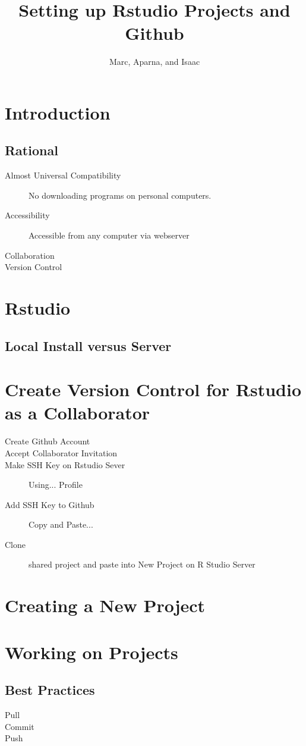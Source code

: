 \documentclass{article}
\author{Marc, Aparna, and Isaac}
\title{Setting up Rstudio Projects and Github}
\begin{document}

\maketitle

\section{Introduction}

\subsection{Rational}

\begin{description}
  \item[Almost Universal Compatibility] No downloading programs on personal computers.
  \item[Accessibility] Accessible from any computer via webserver
  \item[Collaboration]
  \item[Version Control]
\end{description}

\section{Rstudio}

\subsection{Local Install versus Server}



\section{Create Version Control for Rstudio as a Collaborator}

\begin{description}
  \item[Create Github Account]
  \item[Accept Collaborator Invitation]

  \item[Make SSH Key on Rstudio Sever] Using... Profile
  \item[Add SSH Key to Github] Copy and Paste...
  \item[Clone] shared project and paste into New Project on R Studio Server
\end{description}

\section{Creating a New Project}

\section{Working on Projects}

\subsection{Best Practices}

\begin{description}
  \item[Pull]
  \item[Commit]
  \item[Push]
\end{description}
\end{document}
